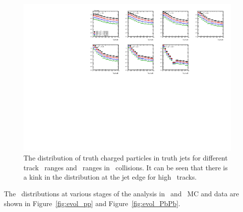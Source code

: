 \begin{figure}
\centering
\includegraphics[page=1, width=1\textwidth]{figures/main/corrections/TruthProj_pp}
\caption{The distribution of truth charged particles in truth jets for different track \pt\ ranges and \ptjet\ ranges in \pp\ collisions.
It can be seen that there is a kink in the distribution at the jet edge for high \pt\ tracks.}
\label{fig:truthProj_pp}
\end{figure}


The \Dptr\ distributions at various stages of the analysis in \pp\ and \pbpb\ MC and data are shown in Figure~\ref{fig:evol_pp} and Figure~\ref{fig:evol_PbPb}.

